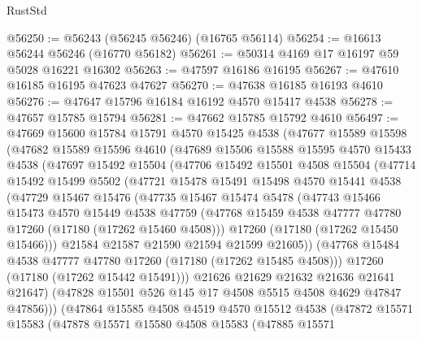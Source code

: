 \begin{lexlean}{RustStd}
\begin{coremodule}
@56250 := @56243 (@56245 @56246) (@16765 @56114)
@56254 := @16613 @56244 @56246 (@16770 @56182)
@56261 := @50314 @4169 @17 @16197 @59 @5028 @16221 @16302
@56263 := @47597 @16186 @16195
@56267 := @47610 @16185 @16195 @47623 @47627
@56270 := @47638 @16185 @16193 @4610
@56276 := @47647 @15796 @16184 @16192 @4570 @15417 @4538
@56278 := @47657 @15785 @15794
@56281 := @47662 @15785 @15792 @4610
@56497 := @47669
    @15600
    @15784
    @15791
    @4570
    @15425
    @4538
    (@47677
      @15589
      @15598
      (@47682
        @15589
        @15596
        @4610
        (@47689
          @15506
          @15588
          @15595
          @4570
          @15433
          @4538
          (@47697
            @15492
            @15504
            (@47706
              @15492
              @15501
              @4508
              @15504
              (@47714
                @15492
                @15499
                @5502
                (@47721
                  @15478
                  @15491
                  @15498
                  @4570
                  @15441
                  @4538
                  (@47729
                    @15467
                    @15476
                    (@47735
                      @15467
                      @15474
                      @5478
                      (@47743
                        @15466
                        @15473
                        @4570
                        @15449
                        @4538
                        @47759
                        (@47768 @15459 @4538 @47777 @47780 @17260 (@17180 (@17262 @15460 @4508)))
                        @17260
                        (@17180 (@17262 @15450 @15466)))
                      @21584
                      @21587
                      @21590
                      @21594
                      @21599
                      @21605))
                  (@47768 @15484 @4538 @47777 @47780 @17260 (@17180 (@17262 @15485 @4508)))
                  @17260
                  (@17180 (@17262 @15442 @15491)))
                @21626
                @21629
                @21632
                @21636
                @21641
                @21647)
              (@47828 @15501 @526 @145 @17 @4508 @5515 @4508 @4629 @47847 @47856)))
          (@47864
            @15585
            @4508
            @4519
            @4570
            @15512
            @4538
            (@47872
              @15571
              @15583
              (@47878
                @15571
                @15580
                @4508
                @15583
                (@47885
                  @15571

\end{coremodule}
\end{lexlean}
